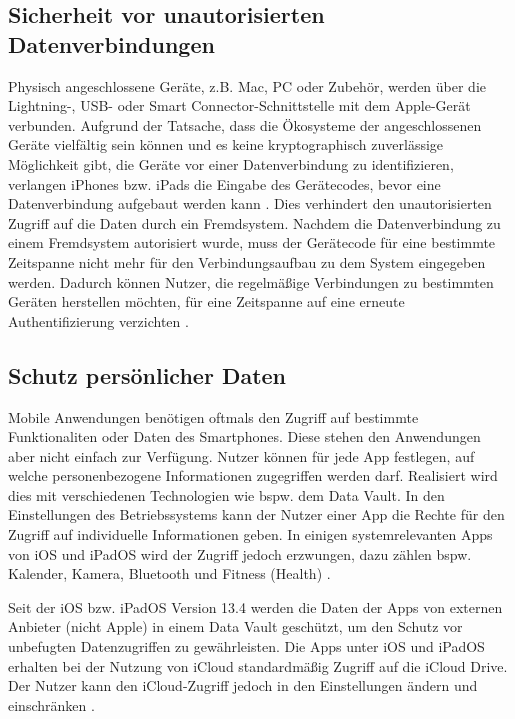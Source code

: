 \subsection{Sicherheit vor unautorisierten  Datenverbindungen}
Physisch angeschlossene Geräte,  z.B. Mac, PC oder Zubehör, werden über die Lightning-, USB- oder Smart 
Connector-Schnittstelle mit dem Apple-Gerät verbunden. Aufgrund der Tatsache, dass die Ökosysteme der
angeschlossenen Geräte vielfältig sein können und es keine kryptographisch zuverlässige Möglichkeit gibt,
die Geräte vor einer Datenverbindung zu identifizieren, verlangen iPhones bzw. iPads die Eingabe des Gerätecodes,
bevor eine Datenverbindung aufgebaut werden kann \cite[S. 65]{apple2020}. Dies verhindert den unautorisierten
Zugriff auf die Daten durch ein Fremdsystem. Nachdem die Datenverbindung zu einem Fremdsystem autorisiert wurde, 
muss der Gerätecode für eine bestimmte Zeitspanne nicht mehr für den Verbindungsaufbau zu dem System 
eingegeben werden. Dadurch können Nutzer, die regelmäßige Verbindungen zu bestimmten Geräten herstellen möchten,
für eine Zeitspanne auf eine erneute Authentifizierung verzichten
\cite{apple2020}.

\subsection{Schutz persönlicher Daten}
Mobile Anwendungen benötigen oftmals den Zugriff auf bestimmte Funktionaliten oder Daten des Smartphones.
Diese stehen den Anwendungen aber nicht einfach zur Verfügung. Nutzer können für jede App festlegen, auf 
welche personenbezogene Informationen zugegriffen werden darf. Realisiert wird dies mit verschiedenen Technologien 
wie bspw. dem Data Vault. In den Einstellungen des Betriebssystems kann der Nutzer einer App die Rechte für den Zugriff 
auf individuelle Informationen geben. In einigen systemrelevanten Apps von iOS und iPadOS wird der Zugriff jedoch erzwungen, 
dazu zählen bspw. Kalender, Kamera, Bluetooth und Fitness (Health)
\cite{apple2020}.

Seit der iOS bzw. iPadOS Version 13.4 werden die Daten der Apps von externen Anbieter (nicht Apple) in einem Data Vault geschützt, 
um den Schutz vor unbefugten Datenzugriffen zu gewährleisten. Die Apps unter iOS und iPadOS erhalten bei der Nutzung von iCloud 
standardmäßig Zugriff auf die iCloud Drive. Der Nutzer kann den iCloud-Zugriff
jedoch in den Einstellungen ändern und einschränken \cite{apple2020}.

